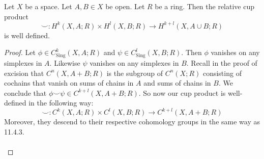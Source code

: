 \documentclass[a4paper]{article}
\begin{document}
\begin{lmm}{}{} Let $X$ be a space. Let $A,B\in X$ be open. Let $R$ be a ring. Then the relative cup product $$\smile:H^k(X,A;R)\times H^l(X,B;R)\to H^{k+l}(X,A\cup B;R)$$ is well defined. \tcbline
\begin{proof}
Let $\phi\in C_\text{Sing}^k(X,A;R)$ and $\psi\in C_\text{Sing}^l(X,B;R)$. Then $\phi$ vanishes on any simplexes in $A$. Likewise $\psi$ vanishes on any simplexes in $B$. Recall in the proof of excision that $C^n(X,A+B;R)$ is the subgroup of $C^n(X;R)$ consisting of cochains that vanish on sums of chains in $A$ and sums of chains in $B$. We conclude that $\phi\smile\psi\in C^{k+l}(X,A+B;R)$. So now our cup product is well-defined in the following way: $$\smile:C^k(X,A;R)\times C^l(X,B;R)\to C^{k+l}(X,A+B;R)$$ Moreover, they descend to their respective cohomology groups in the same way as 11.4.3. \\~\\


\end{proof}
\end{lmm}
\end{document}
